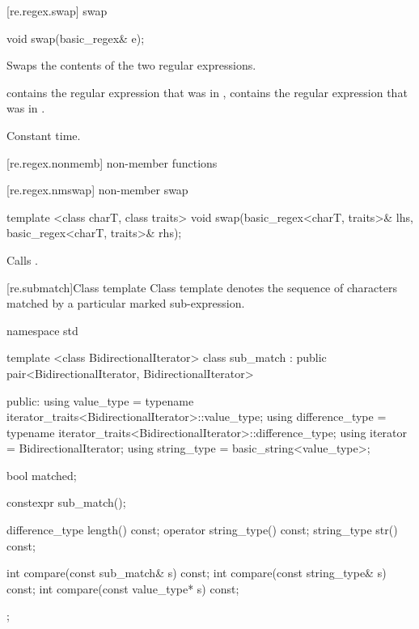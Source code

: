 [re.regex.swap]{ swap}
%

%
\begin{itemdecl}
void swap(basic_regex& e);
\end{itemdecl}

\begin{itemdescr}
\pnum\effects  Swaps the contents of the two regular expressions.

\pnum\postconditions  {} contains the regular expression
that was in ,  contains the regular expression that
was in .

\pnum\complexity Constant time.
\end{itemdescr}

[re.regex.nonmemb]{ non-member functions}

[re.regex.nmswap]{ non-member swap}
%
\begin{itemdecl}
template <class charT, class traits>
  void swap(basic_regex<charT, traits>& lhs, basic_regex<charT, traits>& rhs);
\end{itemdecl}

\begin{itemdescr}
\pnum\effects  Calls .
\end{itemdescr}

[re.submatch]{Class template }
\pnum
{}%
Class template  denotes the sequence of characters matched
by a particular marked sub-expression.

\begin{codeblock}
namespace std {
  template <class BidirectionalIterator>
  class sub_match : public pair<BidirectionalIterator, BidirectionalIterator> {
  public:
     using value_type      =
             typename iterator_traits<BidirectionalIterator>::value_type;
     using difference_type =
             typename iterator_traits<BidirectionalIterator>::difference_type;
     using iterator        = BidirectionalIterator;
     using string_type     = basic_string<value_type>;

     bool matched;

     constexpr sub_match();

     difference_type length() const;
     operator string_type() const;
     string_type str() const;

     int compare(const sub_match& s) const;
     int compare(const string_type& s) const;
     int compare(const value_type* s) const;
  };
}
\end{codeblock}


